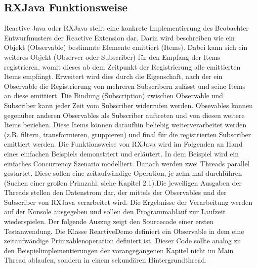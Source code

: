 \documentclass[12pt,oneside,a4paper,bibtotoc,liststotoc]{scrreprt}
\begin{document}
\subsection{RXJava Funktionsweise}
Reactive Java oder RXJava stellt eine konkrete Implementierung des Beobachter Entwurfmusters der Reactive Extension dar. Darin wird beschreiben wie ein Objekt (Observable) bestimmte Elemente emittiert (Items). Dabei kann sich ein weiteres Objekt (Observer oder Subscriber) für den Empfang der Items registrieren, womit dieses ab dem Zeitpunkt der Registrierung alle emittierten Items empfängt. Erweitert wird dies durch die Eigenschaft, nach der ein Observable die Registrierung von mehreren Subscribern zulässt und seine Items an diese emittiert. Die Bindung (Subscription) zwischen Observable und Subscriber kann jeder Zeit vom Subscriber widerrufen werden. Obsevables können gegenüber anderen Observables als Subscriber auftreten und von diesen weitere Items beziehen. Diese Items können daraufhin beliebig weiterverarbeitet werden (z.B. filtern, transformieren, gruppieren) und final für die registrierten Subscriber emittiert werden. Die Funktionsweise von RXJava wird im Folgenden an Hand eines einfachen Beispiels demonstriert und erläutert. In dem Beispiel wird ein einfaches Concurrency Szenario modelliert. Danach werden zwei Threads parallel gestartet. Diese sollen eine zeitaufwändige Operation, je zehn mal durchführen (Suchen einer großen Primzahl, siehe Kapitel 2.1).Die jeweiligen Ausgaben der Threads stellen den Datenstrom dar, der mittels der Observables und der Subscriber von RXJava verarbeitet wird. Die Ergebnisse der Verarbeitung werden auf der Konsole ausgegeben und sollen den Programmablauf zur Laufzeit wiederspielen. Der folgende Auszug zeigt den Sourcecode einer ersten Testanwendung. Die Klasse ReactiveDemo definiert ein Observable in dem eine zeitaufwändige Primzahlenoperation definiert ist. Dieser Code sollte analog zu den Beispielimplementierungen der vorangegangenen Kapitel nicht im Main Thread ablaufen, sondern in einem sekundären Hintergrundthread.\newline
\end{document}
